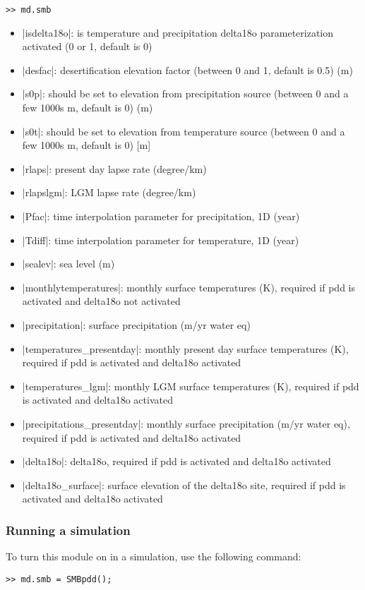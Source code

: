 \begin{lstlisting}
>> md.smb
\end{lstlisting}

\begin{itemize}
	\item \lstinlinebg|isdelta18o|:  is temperature and precipitation delta18o parameterization activated (0 or 1, default is 0)
	\item \lstinlinebg|desfac|:  desertification elevation factor (between 0 and 1, default is 0.5) (m)
	\item \lstinlinebg|s0p|:  should be set to elevation from precipitation source (between 0 and a few 1000s m, default is 0) (m)
	\item \lstinlinebg|s0t|:   should be set to elevation from temperature source (between 0 and a few 1000s m, default is 0) [m]
	\item \lstinlinebg|rlaps|:  present day lapse rate (degree/km)
	\item \lstinlinebg|rlapslgm|: LGM lapse rate (degree/km)
	\item \lstinlinebg|Pfac|:  time interpolation parameter for precipitation, 1D (year)
	\item \lstinlinebg|Tdiff|: time interpolation parameter for temperature, 1D (year)
	\item \lstinlinebg|sealev|:  sea level (m)
	\item \lstinlinebg|monthlytemperatures|:  monthly surface temperatures (K), required if pdd is activated and delta18o not activated
	\item \lstinlinebg|precipitation|:  surface precipitation (m/yr water eq)
	\item \lstinlinebg|temperatures_presentday|:  monthly present day surface temperatures (K), required if pdd is activated and delta18o activated
	\item \lstinlinebg|temperatures_lgm|:  monthly LGM surface temperatures (K), required if pdd is activated and delta18o activated
	\item \lstinlinebg|precipitations_presentday|:  monthly surface precipitation (m/yr water eq), required if pdd is activated and delta18o activated
	\item \lstinlinebg|delta18o|:  delta18o, required if pdd is activated and delta18o activated
	\item \lstinlinebg|delta18o_surface|:  surface elevation of the delta18o site, required if pdd is activated and delta18o activated
\end{itemize}

\subsubsection{Running a simulation}
To turn this module on in a simulation, use the following command:
\begin{lstlisting}
>> md.smb = SMBpdd();
\end{lstlisting}

\clearpage %
